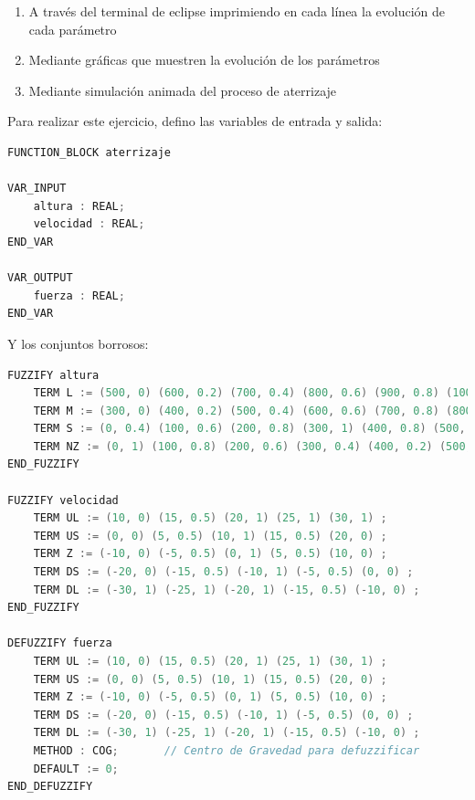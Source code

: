 \documentclass[
]{article}
\begin{document}
\begin{enumerate}
  \begin{enumerate}
  \def\labelenumii{\alph{enumii}.}
  \item
    A través del terminal de eclipse imprimiendo en cada línea la
    evolución de cada parámetro
  \item
    Mediante gráficas que muestren la evolución de los parámetros
  \item
    Mediante simulación animada del proceso de aterrizaje
  \end{enumerate}
\end{enumerate}

Para realizar este ejercicio, defino las variables de entrada y salida:

\begin{lstlisting}[language=Java, caption=Definición de variables de entrada y salida]
FUNCTION_BLOCK aterrizaje   

VAR_INPUT               
    altura : REAL;
    velocidad : REAL;
END_VAR

VAR_OUTPUT              
    fuerza : REAL;
END_VAR
\end{lstlisting}

Y los conjuntos borrosos:

\begin{lstlisting}[language=Java, caption=Definición de los conjuntos borrosos]
FUZZIFY altura          
    TERM L := (500, 0) (600, 0.2) (700, 0.4) (800, 0.6) (900, 0.8) (1000, 1) ; 
    TERM M := (300, 0) (400, 0.2) (500, 0.4) (600, 0.6) (700, 0.8) (800, 1) (900, 0.8) (1000, 0.6) ; 
    TERM S := (0, 0.4) (100, 0.6) (200, 0.8) (300, 1) (400, 0.8) (500, 0.6) (600, 0.4) (700, 0.2) ;
    TERM NZ := (0, 1) (100, 0.8) (200, 0.6) (300, 0.4) (400, 0.2) (500, 0) ;  
END_FUZZIFY

FUZZIFY velocidad           
    TERM UL := (10, 0) (15, 0.5) (20, 1) (25, 1) (30, 1) ;
    TERM US := (0, 0) (5, 0.5) (10, 1) (15, 0.5) (20, 0) ;
    TERM Z := (-10, 0) (-5, 0.5) (0, 1) (5, 0.5) (10, 0) ;
    TERM DS := (-20, 0) (-15, 0.5) (-10, 1) (-5, 0.5) (0, 0) ;
    TERM DL := (-30, 1) (-25, 1) (-20, 1) (-15, 0.5) (-10, 0) ;
END_FUZZIFY

DEFUZZIFY fuerza            
    TERM UL := (10, 0) (15, 0.5) (20, 1) (25, 1) (30, 1) ;
    TERM US := (0, 0) (5, 0.5) (10, 1) (15, 0.5) (20, 0) ;
    TERM Z := (-10, 0) (-5, 0.5) (0, 1) (5, 0.5) (10, 0) ;
    TERM DS := (-20, 0) (-15, 0.5) (-10, 1) (-5, 0.5) (0, 0) ;
    TERM DL := (-30, 1) (-25, 1) (-20, 1) (-15, 0.5) (-10, 0) ;
    METHOD : COG;       // Centro de Gravedad para defuzzificar
    DEFAULT := 0;       
END_DEFUZZIFY
\end{lstlisting}
\end{document}
